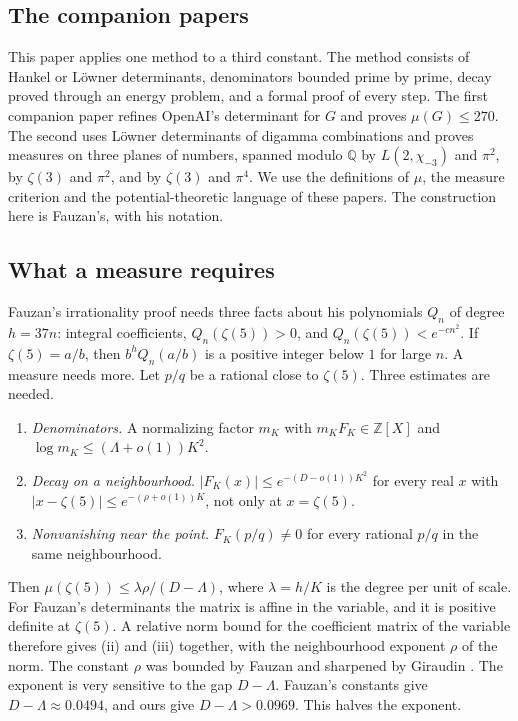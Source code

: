 \documentclass[11pt]{amsart}
\theoremstyle{definition}
\theoremstyle{remark}
\numberwithin{equation}{section}
\newcommand{\Z}{\mathbb Z}
\newcommand{\Q}{\mathbb Q}
\begin{document}
\subsection{The companion papers}
This paper applies one method to a third constant. The method consists of Hankel or L\"owner determinants,
denominators bounded prime by prime, decay proved through an energy problem, and a formal proof of every step. The
first companion paper \cite{Litsey2026} refines OpenAI's determinant for $G$ and proves $\mu(G)\le270$. The second
\cite{Litsey2026b} uses L\"owner determinants of digamma combinations and proves measures on three planes of numbers,
spanned modulo $\Q$ by $L(2,\chi_{-3})$ and $\pi^2$, by $\zeta(3)$ and $\pi^2$, and by $\zeta(3)$ and $\pi^4$. We use the definitions of $\mu$, the measure criterion and the
potential-theoretic language of these papers. The construction here is Fauzan's, with his notation.

\subsection{What a measure requires}
Fauzan's irrationality proof needs three facts about his polynomials $Q_n$ of degree $h=37n$: integral coefficients,
$Q_n(\zeta(5))>0$, and $Q_n(\zeta(5))<e^{-cn^2}$. If $\zeta(5)=a/b$, then $b^hQ_n(a/b)$ is a positive integer below
$1$ for large $n$. A measure needs more. Let $p/q$ be a rational close to $\zeta(5)$. Three estimates are needed.
\begin{enumerate}[label=(\roman*)]
\item \emph{Denominators.} A normalizing factor $m_K$ with $m_KF_K\in\Z[X]$ and $\log m_K\le(\Lambda+o(1))K^2$.
\item \emph{Decay on a neighbourhood.} $|F_K(x)|\le e^{-(D-o(1))K^2}$ for every real $x$ with
 $|x-\zeta(5)|\le e^{-(\rho+o(1))K}$, not only at $x=\zeta(5)$.
\item \emph{Nonvanishing near the point.} $F_K(p/q)\ne0$ for every rational $p/q$ in the same neighbourhood.
\end{enumerate}
Then $\mu(\zeta(5))\le\lambda\rho/(D-\Lambda)$, where $\lambda=h/K$ is the degree per unit of scale. For Fauzan's
determinants the matrix is affine in the variable, and it is positive definite at $\zeta(5)$. A relative norm bound
for the coefficient matrix of the variable therefore gives (ii) and (iii) together, with the neighbourhood exponent
$\rho$ of the norm. The constant $\rho$ was bounded by Fauzan \cite[Appendix~C]{Fauzan2026} and sharpened by Giraudin
\cite{Giraudin26z5}. The exponent is very sensitive to the gap $D-\Lambda$. Fauzan's constants give
$D-\Lambda\approx0.0494$, and ours give $D-\Lambda>0.0969$. This halves the exponent.
\end{document}
